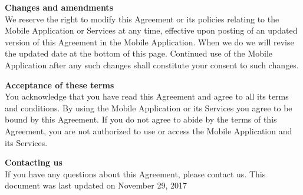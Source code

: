 \documentclass[letterpaper,10pt]{article}
\begin{document}
\begin{appendices}
\large{\textbf{Changes and amendments}} \\
We reserve the right to modify this Agreement or its policies relating to the Mobile Application or Services at any time, effective upon posting of an updated version of this Agreement in the Mobile Application. When we do we will revise the updated date at the bottom of this page. Continued use of the Mobile Application after any such changes shall constitute your consent to such changes. 

\large{\textbf{Acceptance of these terms}} \\
You acknowledge that you have read this Agreement and agree to all its terms and conditions. By using the Mobile Application or its Services you agree to be bound by this Agreement. If you do not agree to abide by the terms of this Agreement, you are not authorized to use or access the Mobile Application and its Services.

\large{\textbf{Contacting us}} \\
If you have any questions about this Agreement, please contact us.
This document was last updated on November 29, 2017

\end{appendices}

\newpage



\printbibliography[heading=bibintoc]
\end{document}
